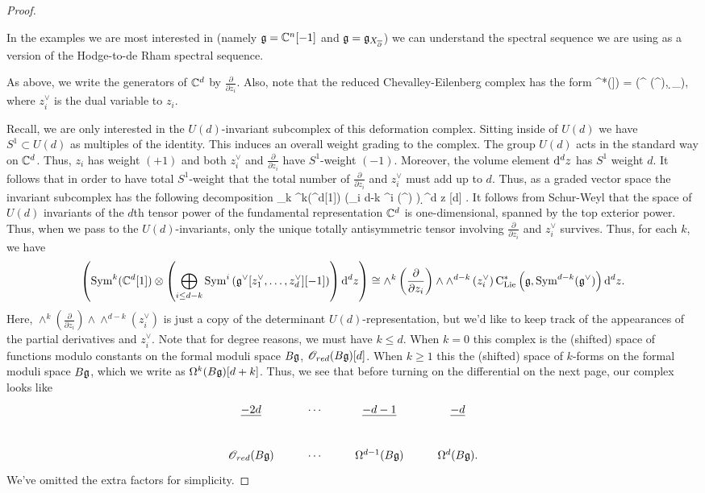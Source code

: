 \begin{proof}
\begin{rmk}
In the examples we are most interested in (namely $\mathfrak g = \mathbb C^n[-1]$ and $\mathfrak g = \mathfrak g_{X_{\overline{\partial}}}$) we can understand the spectral sequence we are using as a version of the Hodge-to-de Rham spectral sequence.
\end{rmk}

As above, we write the generators of $\mathbb C^d$ by $\frac{\partial}{\partial z_i}$. 
Also, note that the reduced Chevalley-Eilenberg complex has the form
\beqn
\cred^*(\fg[[z_1,\ldots,z_n]]) = \left(\Sym^{} \left(\fg^ \right), \d_{\fg}\right),
\eeqn
where $z_i^\vee$ is the dual variable to $z_i$. 

Recall, we are only interested in the $U(d)$-invariant subcomplex of this deformation complex. 
Sitting inside of $U(d)$ we have $S^1 \subset U(d)$ as multiples of the identity. 
This induces an overall weight grading to the complex.
The group $U(d)$ acts in the standard way on $\mathbb C^d$.
Thus, $z_i$ has weight $(+1)$ and both $z_i^\vee$ and $\frac{\partial}{\partial z_i}$ have $S^1$-weight $(-1)$. 
Moreover, the volume element ${\rm d}^d z$ has $S^1$ weight $d$.
It follows that in order to have total $S^1$-weight that the total number of $\frac{\partial}{\partial z_i}$ and $z_i^\vee$ must add up to $d$.
Thus, as a graded vector space the invariant subcomplex has the following decomposition
\beqn
\bigoplus_k \Sym^k(\CC^d[1]) \tensor \left(\bigoplus_{i \leq d-k} \Sym^{i} \left(\fg^ \right) \right) \d^d z [d] .
\eeqn
It follows from Schur-Weyl that the space of $U(d)$ invariants of the $d$th tensor power of the fundamental representation $\mathbb C^d$ is one-dimensional, spanned by the top exterior power. 
Thus, when we pass to the $U(d)$-invariants, only the unique totally antisymmetric tensor involving $\frac{\partial}{\partial z_i}$ and $z_i^\vee$ survives. 
Thus, for each $k$, we have
\[
\label{U(d) invariants}
\left({\rm Sym}^k(\mathbb C^d[1]) \otimes \left(\bigoplus_{i \leq d-k} {\rm Sym}^{i} \left(\mathfrak g^\vee [z_1^\vee,\ldots,z_d^\vee][-1] \right) \right) {\rm d}^d z\right) \cong \wedge^{k}\left(\frac{\partial}{\partial z_i}\right) \wedge \wedge^{d-k}\left(z_i^\vee\right) {\rm C}_{{\rm Lie}}^*\left(\mathfrak g , {\rm Sym}^{d-k}(\mathfrak g^\vee)\right) {\rm d}^d z .
\]
Here, $\wedge^{k}\left(\frac{\partial}{\partial z_i}\right) \wedge \wedge^{d-k}\left(z_i^\vee\right)$ is just a copy of the determinant $U(d)$-representation, but we'd like to keep track of the appearances of the partial derivatives and $z_i^\vee$. 
Note that for degree reasons, we must have $k \leq d$. 
When $k = 0$ this complex is the (shifted) space of functions modulo constants on the formal moduli space $B\mathfrak g$, $\mathscr O_{red}(B\mathfrak g)[d]$. 
When $k \geq 1$ this the (shifted) space of $k$-forms on the formal moduli space $B\mathfrak g$, which we write as $\Omega^{k}(B \mathfrak g)[d+k]$.
Thus, we see that before turning on the differential on the next page, our complex looks like
\[
\label{bg def complex1}
\xymatrix{
\ul{-2d} & \cdots & \ul{-d-1} & \ul{-d} \\
\sO_{red}(B \fg) & \cdots & \Omega^{d-1} (B \fg) & \Omega^{d}(B \fg) .
}
\]
We've omitted the extra factors for simplicity. 


\end{proof}
